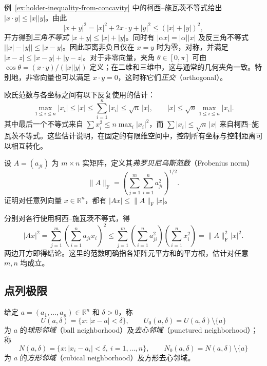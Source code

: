 例~\ref{ex:holder-inequality-from-concavity} 中的柯西--施瓦茨不等式给出 $|x\cdot y|\leq|x||y|$。由此
\[
    |x+y|^2=|x|^2+2x\cdot y+|y|^2\leq(|x|+|y|)^2,
\]
开方得到\emph{三角不等式} $|x+y|\leq|x|+|y|$。同时有 $|\alpha x|=|\alpha||x|$ 及反三角不等式 $\bigl||x|-|y|\bigr|\leq|x-y|$。因此距离非负且仅在 $x=y$ 时为零，对称，并满足 $|x-z|\leq|x-y|+|y-z|$。对于非零向量，夹角 $\theta\in[0,\pi]$ 可由 $\cos\theta=(x\cdot y)/(|x||y|)$ 定义；在二维和三维中，这与通常的几何夹角一致。特别地，非零向量也可以满足 $x\cdot y=0$，这时称它们\emph{正交}（orthogonal）。

欧氏范数与各坐标之间有以下反复使用的估计：
\begin{equation}
    \max_{1\leq i\leq n}|x_i|
    \leq |x|\leq\sum_{i=1}^n|x_i|
    \leq\sqrt n\,|x|,
    \qquad
    |x|\leq\sqrt n\max_{1\leq i\leq n}|x_i|.
    \label{eq:euclidean-coordinate-norm-bounds}
\end{equation}
其中最后一个不等式来自 $\sum x_i^2\leq n\max_i|x_i|^2$，而 $\sum|x_i|\leq\sqrt n\,|x|$ 来自柯西--施瓦茨不等式。这些估计说明，在固定的有限维空间中，控制所有坐标与控制距离可以相互转化。

\begin{example}
\label{ex:matrix-frobenius-vector-bound}
设 $A=(a_{ji})$ 为 $m\times n$ 实矩阵，定义其\emph{弗罗贝尼乌斯范数}（Frobenius norm）
\[
    \|A\|_{\mathrm F}=\left(\sum_{j=1}^m\sum_{i=1}^n a_{ji}^2\right)^{1/2}.
\]
证明对任意列向量 $x\in\mathbb R^n$，都有 $|Ax|\leq\|A\|_{\mathrm F}|x|$。
\end{example}

\begin{solve}
分别对各行使用柯西--施瓦茨不等式，得
\[
    |Ax|^2=\sum_{j=1}^m\left(\sum_{i=1}^n a_{ji}x_i\right)^2
    \leq\sum_{j=1}^m\left(\sum_{i=1}^n a_{ji}^2\right)
                            \left(\sum_{i=1}^n x_i^2\right)
    =\|A\|_{\mathrm F}^2|x|^2.
\]
两边开方即得结论。这里的范数明确指各矩阵元平方和的平方根，估计对任意 $m,n$ 均成立。
\end{solve}

\subsection{点列极限}
\label{subsec:limits-of-point-sequences}

\begin{definition}
\label{def:euclidean-neighborhoods}
给定 $a=(a_1,\ldots,a_n)\in\mathbb R^n$ 和 $\delta>0$，称
\[
    U(a,\delta)=\{x:|x-a|<\delta\},\qquad
    U_0(a,\delta)=U(a,\delta)\setminus\{a\}
\]
为 $a$ 的\emph{球形邻域}（ball neighborhood）及\emph{去心邻域}（punctured neighborhood）；称
\[
    N(a,\delta)=\{x:|x_i-a_i|<\delta,\ i=1,\ldots,n\},\qquad
    N_0(a,\delta)=N(a,\delta)\setminus\{a\}
\]
为 $a$ 的\emph{方形邻域}（cubical neighborhood）及方形去心邻域。
\end{definition}

